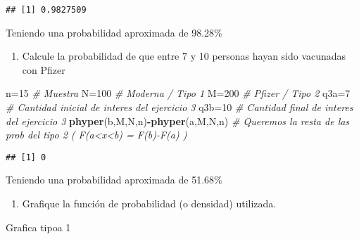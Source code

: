 \documentclass[
]{article}
\newenvironment{Shaded}{\begin{snugshade}}{\end{snugshade}}
\newcommand{\CommentTok}[1]{\textcolor[rgb]{0.56,0.35,0.01}{\textit{#1}}}
\newcommand{\DecValTok}[1]{\textcolor[rgb]{0.00,0.00,0.81}{#1}}
\newcommand{\FunctionTok}[1]{\textcolor[rgb]{0.13,0.29,0.53}{\textbf{#1}}}
\newcommand{\NormalTok}[1]{#1}
\newcommand{\OtherTok}[1]{\textcolor[rgb]{0.56,0.35,0.01}{#1}}
\newcommand{\SpecialCharTok}[1]{\textcolor[rgb]{0.81,0.36,0.00}{\textbf{#1}}}
\providecommand{\tightlist}{%
  \setlength{\itemsep}{0pt}\setlength{\parskip}{0pt}}
\begin{document}
\begin{verbatim}
## [1] 0.9827509
\end{verbatim}

Teniendo una probabilidad aproximada de 98.28\%

\begin{enumerate}
\def\labelenumi{\arabic{enumi}.}
\setcounter{enumi}{2}
\tightlist
\item
  Calcule la probabilidad de que entre 7 y 10 personas hayan sido
  vacunadas con Pfizer
\end{enumerate}

\begin{Shaded}
\begin{Highlighting}[]
\NormalTok{n}\OtherTok{=}\DecValTok{15} \CommentTok{\# Muestra}
\NormalTok{N}\OtherTok{=}\DecValTok{100} \CommentTok{\# Moderna / Tipo 1}
\NormalTok{M}\OtherTok{=}\DecValTok{200} \CommentTok{\# Pfizer / Tipo 2}
\NormalTok{q3a}\OtherTok{=}\DecValTok{7} \CommentTok{\# Cantidad inicial de interes del ejercicio 3}
\NormalTok{q3b}\OtherTok{=}\DecValTok{10} \CommentTok{\# Cantidad final de interes del ejercicio 3}
\FunctionTok{phyper}\NormalTok{(b,M,N,n)}\SpecialCharTok{{-}}\FunctionTok{phyper}\NormalTok{(a,M,N,n) }\CommentTok{\# Queremos la resta de las prob del tipo 2 ( F(a\textless{}x\textless{}b) = F(b){-}F(a) )}
\end{Highlighting}
\end{Shaded}

\begin{verbatim}
## [1] 0
\end{verbatim}

Teniendo una probabilidad aproximada de 51.68\%

\begin{enumerate}
\def\labelenumi{\arabic{enumi}.}
\setcounter{enumi}{3}
\tightlist
\item
  Grafique la función de probabilidad (o densidad) utilizada.
\end{enumerate}

Grafica tipoa 1
\end{document}

